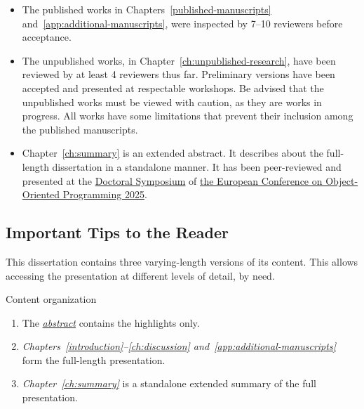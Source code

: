 \begin{itemize}

\item The published works in Chapters~\autoref{published-manuscripts}
and~\autoref{app:additional-manuscripts}, were inspected by 7--10 reviewers
before acceptance.

\item The unpublished works, in Chapter~\autoref{ch:unpublished-research}, have
been reviewed by at least 4 reviewers thus far. Preliminary versions have been
accepted and presented at respectable workshops. Be advised that the unpublished
works must be viewed with caution, as they are works in progress. All works have
some limitations that prevent their inclusion among the published manuscripts.

\item Chapter~\autoref{ch:summary} is an extended abstract. It describes about
the full-length dissertation in a standalone manner. It has been peer-reviewed
and presented at the
\href{https://2025.ecoop.org/track/ecoop-2025-doctoral-symposium}{Doctoral
Symposium} of \href{https://2025.ecoop.org}{the European Conference on
Object-Oriented Programming 2025}.

\end{itemize}

\subsection{Important Tips to the Reader}
\label{subsec:tips}

This dissertation contains three varying-length versions of its content.
This allows accessing the presentation at different levels of detail, by need.

\begin{infobox}[]{Content organization}
\begin{enumerate}[wide, labelwidth=!, labelindent=0pt]

\item The \emph{\hyperref[abs]{abstract}} contains the highlights only.

\item \emph{Chapters~\autoref{introduction}--\autoref{ch:discussion}
and~\autoref{app:additional-manuscripts}} form the full-length presentation.

\item \emph{Chapter~\autoref{ch:summary}} is a standalone extended summary of
the full presentation.
\end{enumerate}
\end{infobox}

